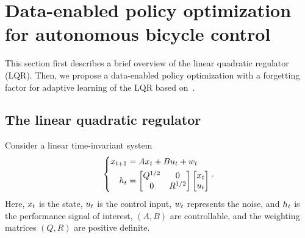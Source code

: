 \section{Data-enabled policy optimization for autonomous bicycle  control}
\label{sec:3}
This section first describes a brief overview of the linear quadratic regulator (LQR). Then, we propose a data-enabled policy optimization with a forgetting factor for adaptive learning of the LQR based on~\cite{zhao2023data, zhao2024data}. 

\subsection{The linear quadratic regulator}
	Consider a linear time-invariant system
	\begin{equation}\label{equ:sys}
	\left\{\begin{aligned}
	x_{t+1} & =A x_{t}+B u_{t}+w_{t} \\
	h_{t} & =\begin{bmatrix}
	Q^{1 / 2} & 0 \\
	0 & R^{1 / 2}
	\end{bmatrix}
	\begin{bmatrix}
	x_{t}  \\
	u_{t} 
	\end{bmatrix}
	\end{aligned}\right. .
	\end{equation}
	Here, $x_{t}$ is the state, $u_{t}$ is the control input, $w_{t}$ represents the noise, and $h_{t}$ is the performance signal of interest, $(A,B)$ are controllable, and the weighting matrices $(Q, R)$ are positive definite. 
	
